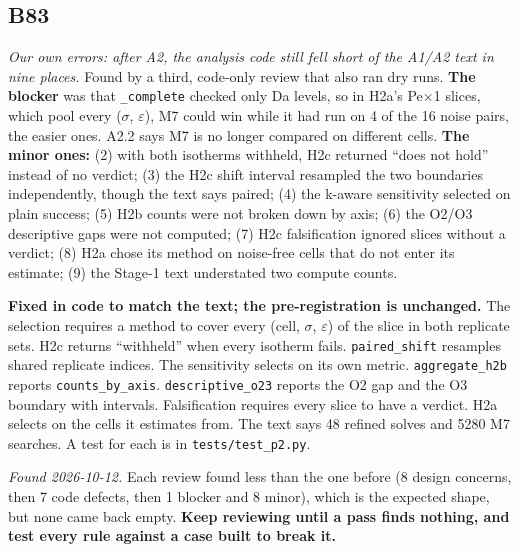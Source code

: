 \documentclass[10pt]{article}
\begin{document}
\subsection*{B83}\label{led:B83}
\begin{description}[leftmargin=0pt,itemsep=1pt]
\item[Defect.] \emph{Our own errors: after A2, the analysis code still fell short of the A1/A2 text in nine places.} Found by a third, code-only review that also ran dry runs. \textbf{The blocker} was that \texttt{\_complete} checked only Da levels, so in H2a's Pe$\times$1 slices, which pool every ($\sigma$, $\varepsilon$), M7 could win while it had run on 4 of the 16 noise pairs, the easier ones. A2.2 says M7 is no longer compared on different cells. \textbf{The minor ones:} (2) with both isotherms withheld, H2c returned ``does not hold'' instead of no verdict; (3) the H2c shift interval resampled the two boundaries independently, though the text says paired; (4) the k-aware sensitivity selected on plain success; (5) H2b counts were not broken down by axis; (6) the O2/O3 descriptive gaps were not computed; (7) H2c falsification ignored slices without a verdict; (8) H2a chose its method on noise-free cells that do not enter its estimate; (9) the Stage-1 text understated two compute counts.
\item[Resolution.] \textbf{Fixed in code to match the text; the pre-registration is unchanged.} The selection requires a method to cover every (cell, $\sigma$, $\varepsilon$) of the slice in both replicate sets. H2c returns ``withheld'' when every isotherm fails. \texttt{paired\_shift} resamples shared replicate indices. The sensitivity selects on its own metric. \texttt{aggregate\_h2b} reports \texttt{counts\_by\_axis}. \texttt{descriptive\_o23} reports the O2 gap and the O3 boundary with intervals. Falsification requires every slice to have a verdict. H2a selects on the cells it estimates from. The text says 48 refined solves and 5280 M7 searches. A test for each is in \texttt{tests/test\_p2.py}.
\item[Note.] \emph{Found 2026-10-12.} Each review found less than the one before (8 design concerns, then 7 code defects, then 1 blocker and 8 minor), which is the expected shape, but none came back empty. \textbf{Keep reviewing until a pass finds nothing, and test every rule against a case built to break it.}
\end{description}
\end{document}

